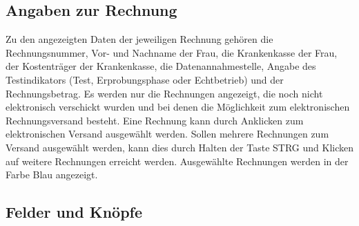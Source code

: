 \subsection{Angaben zur Rechnung}
Zu den angezeigten Daten der jeweiligen Rechnung gehören die
Rechnungsnummer, Vor- und Nachname der Frau, die Krankenkasse der
Frau, der Kostenträger der Krankenkasse, die Datenannahmestelle,
Angabe des Testindikators (Test, Erprobungsphase oder Echtbetrieb)
und der Rechnungsbetrag. Es werden nur die Rechnungen angezeigt, die
noch nicht elektronisch verschickt wurden und bei denen die Möglichkeit
zum elektronischen Rechnungsversand besteht.
Eine Rechnung kann durch Anklicken zum
elektronischen Versand ausgewählt werden. Sollen mehrere Rechnungen
zum Versand ausgewählt werden, kann dies durch Halten der Taste STRG
und Klicken auf weitere Rechnungen erreicht werden. Ausgewählte
Rechnungen werden in der Farbe Blau angezeigt.

\subsection{Felder und Knöpfe}

